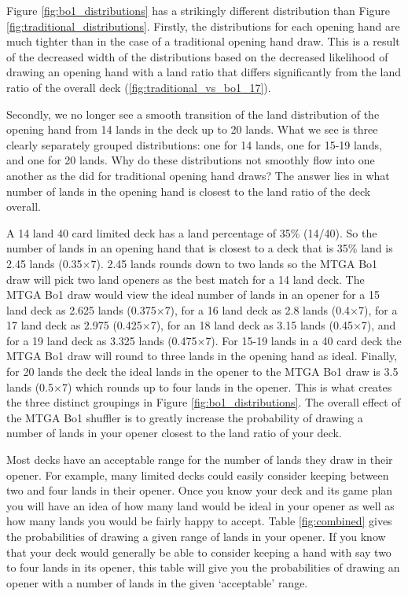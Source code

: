 \documentclass[oneside]{book}   %
\begin{document}
Figure \ref{fig:bo1_distributions} has a strikingly different distribution than Figure \ref{fig:traditional_distributions}. Firstly, the distributions for each opening hand are much tighter than in the case of a traditional opening hand draw. This is a result of the decreased width of the distributions based on the decreased likelihood of drawing an opening hand with a land ratio that differs significantly from the land ratio of the overall deck (\ref{fig:traditional_vs_bo1_17}). 

Secondly, we no longer see a smooth transition of the land distribution of the opening hand from 14 lands in the deck up to 20 lands. What we see is three clearly separately grouped distributions: one for 14 lands, one for 15-19 lands, and one for 20 lands. Why do these distributions not smoothly flow into one another as the did for traditional opening hand draws? The answer lies in what number of lands in the opening hand is closest to the land ratio of the deck overall. 

A 14 land 40 card limited deck has a land percentage of 35\% (14/40). So the number of lands in an opening hand that is closest to a deck that is 35\% land is 2.45 lands (0.35$\times$7). 2.45 lands rounds down to two lands so the MTGA Bo1 draw will pick two land openers as the best match for a 14 land deck. The MTGA Bo1 draw would view the ideal number of lands in an opener for a 15 land deck as 2.625 lands (0.375$\times$7), for a 16 land deck as 2.8 lands (0.4$\times$7), for a 17 land deck as 2.975 (0.425$\times$7), for an 18 land deck as 3.15 lands (0.45$\times$7), and for a 19 land deck as 3.325 lands (0.475$\times$7). For 15-19 lands in a 40 card deck the MTGA Bo1 draw will round to three lands in the opening hand as ideal. Finally, for 20 lands the deck the ideal lands in the opener to the MTGA Bo1 draw is 3.5 lands (0.5$\times$7) which rounds up to four lands in the opener. This is what creates the three distinct groupings in Figure \ref{fig:bo1_distributions}. The overall effect of the MTGA Bo1 shuffler is to greatly increase the probability of drawing a number of lands in your opener closest to the land ratio of your deck. 

Most decks have an acceptable range for the number of lands they draw in their opener. For example, many limited decks could easily consider keeping between two and four lands in their opener. Once you know your deck and its game plan you will have an idea of how many land would be ideal in your opener as well as how many lands you would be fairly happy to accept. Table \ref{fig:combined} gives the probabilities of drawing a given range of lands in your opener. If you know that your deck would generally be able to consider keeping a hand with say two to four lands in its opener, this table will give you the probabilities of drawing an opener with a number of lands in the given `acceptable' range.
\end{document}
